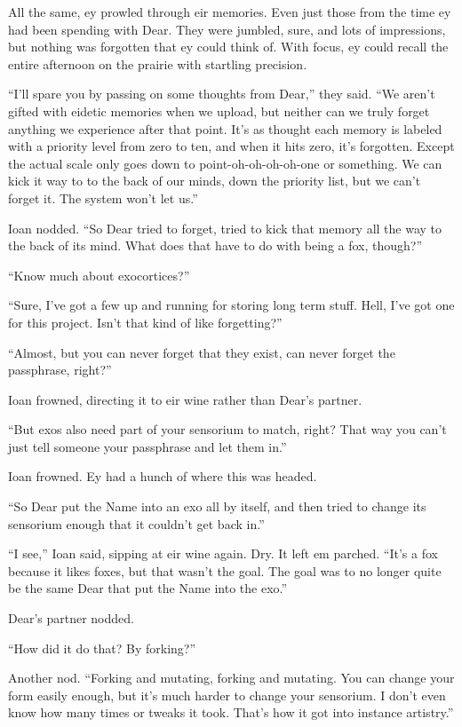 All the same, ey prowled through eir memories. Even just those from the time ey had been spending with Dear. They were jumbled, sure, and lots of impressions, but nothing was forgotten that ey could think of. With focus, ey could recall the entire afternoon on the prairie with startling precision.

``I'll spare you by passing on some thoughts from Dear,'' they said. ``We aren't gifted with eidetic memories when we upload, but neither can we truly forget anything we experience after that point. It's as thought each memory is labeled with a priority level from zero to ten, and when it hits zero, it's forgotten. Except the actual scale only goes down to point-oh-oh-oh-oh-one or something. We can kick it way to to the back of our minds, down the priority list, but we can't forget it. The system won't let us.''

Ioan nodded. ``So Dear tried to forget, tried to kick that memory all the way to the back of its mind. What does that have to do with being a fox, though?''

``Know much about exocortices?''

``Sure, I've got a few up and running for storing long term stuff. Hell, I've got one for this project. Isn't that kind of like forgetting?''

``Almost, but you can never forget that they exist, can never forget the passphrase, right?''

Ioan frowned, directing it to eir wine rather than Dear's partner.

``But exos also need part of your sensorium to match, right? That way you can't just tell someone your passphrase and let them in.''

Ioan frowned. Ey had a hunch of where this was headed.

``So Dear put the Name into an exo all by itself, and then tried to change its sensorium enough that it couldn't get back in.''

``I see,'' Ioan said, sipping at eir wine again. Dry. It left em parched. ``It's a fox because it likes foxes, but that wasn't the goal. The goal was to no longer quite be the same Dear that put the Name into the exo.''

Dear's partner nodded.

``How did it do that? By forking?''

Another nod. ``Forking and mutating, forking and mutating. You can change your form easily enough, but it's much harder to change your sensorium. I don't even know how many times or tweaks it took. That's how it got into instance artistry.''

